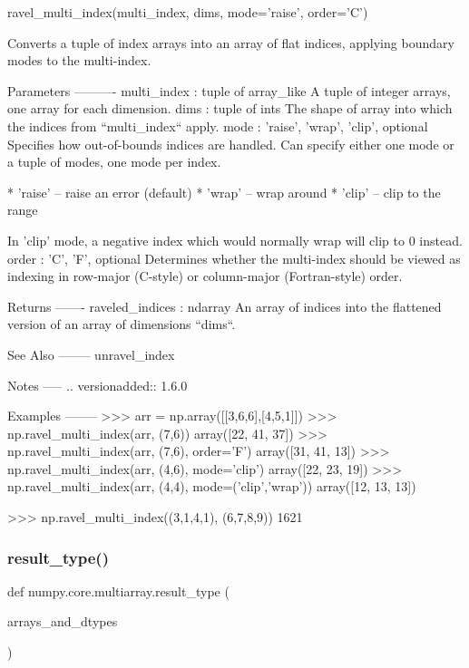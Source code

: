 \begin{DoxyVerb}ravel_multi_index(multi_index, dims, mode='raise', order='C')

Converts a tuple of index arrays into an array of flat
indices, applying boundary modes to the multi-index.

Parameters
----------
multi_index : tuple of array_like
    A tuple of integer arrays, one array for each dimension.
dims : tuple of ints
    The shape of array into which the indices from ``multi_index`` apply.
mode : {'raise', 'wrap', 'clip'}, optional
    Specifies how out-of-bounds indices are handled.  Can specify
    either one mode or a tuple of modes, one mode per index.

    * 'raise' -- raise an error (default)
    * 'wrap' -- wrap around
    * 'clip' -- clip to the range

    In 'clip' mode, a negative index which would normally
    wrap will clip to 0 instead.
order : {'C', 'F'}, optional
    Determines whether the multi-index should be viewed as
    indexing in row-major (C-style) or column-major
    (Fortran-style) order.

Returns
-------
raveled_indices : ndarray
    An array of indices into the flattened version of an array
    of dimensions ``dims``.

See Also
--------
unravel_index

Notes
-----
.. versionadded:: 1.6.0

Examples
--------
>>> arr = np.array([[3,6,6],[4,5,1]])
>>> np.ravel_multi_index(arr, (7,6))
array([22, 41, 37])
>>> np.ravel_multi_index(arr, (7,6), order='F')
array([31, 41, 13])
>>> np.ravel_multi_index(arr, (4,6), mode='clip')
array([22, 23, 19])
>>> np.ravel_multi_index(arr, (4,4), mode=('clip','wrap'))
array([12, 13, 13])

>>> np.ravel_multi_index((3,1,4,1), (6,7,8,9))
1621
\end{DoxyVerb}
 \mbox{\label{namespacenumpy_1_1core_1_1multiarray_a8bb7393227c0206063d74e1b68491262}} 
\subsubsection{\texorpdfstring{result\+\_\+type()}{result\_type()}}
{\footnotesize\ttfamily def numpy.\+core.\+multiarray.\+result\+\_\+type (\begin{DoxyParamCaption}\item[{}]{arrays\+\_\+and\+\_\+dtypes }\end{DoxyParamCaption})}

